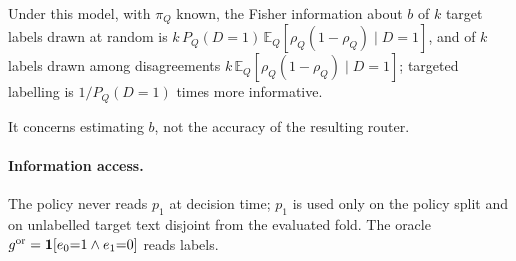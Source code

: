 \begin{proposition}
\label{prop:efficiency}
Under this model, with $\pi_Q$ known, the Fisher information about $b$ of $k$ target labels drawn at random is $k\,P_Q(D{=}1)\,\mathbb E_Q[\rho_Q(1-\rho_Q)\mid D{=}1]$, and of $k$ labels drawn among disagreements $k\,\mathbb E_Q[\rho_Q(1-\rho_Q)\mid D{=}1]$; targeted labelling is $1/P_Q(D{=}1)$ times more informative.
\end{proposition}
It concerns estimating $b$, not the accuracy of the resulting router.

\paragraph{Information access.}
The policy never reads $p_1$ at decision time; $p_1$ is used only on the policy split and on unlabelled target text disjoint from the evaluated fold. The oracle $g^{\rm or}=\mathbf 1[e_0{=}1\wedge e_1{=}0]$ reads labels.
